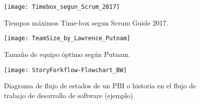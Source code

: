 \begin{figure}[h]
  \centering
  \texttt{[image: Timebox\_segun\_Scrum\_2017]}
  \caption{Tiempos máximos Time-box segun Scrum Guide 2017.}
  \centering
  \label{fig:Timebox_segun_Scrum_2017} 
\end{figure}
\FloatBarrier

\begin{figure}[h]
  \centering
  \texttt{[image: TeamSize\_by\_Lawrence\_Putnam]}
  \caption{Tamaño de equipo óptimo según Putnam.}
  \centering
  \label{fig:TeamSize_by_Lawrence_Putnam} 
\end{figure}
\FloatBarrier

\begin{figure}[h]
  \centering
  \texttt{[image: StoryForkflow-Flowchart\_BW]}
  \caption{Diagrama de flujo de estados de un PBI o historia en el flujo de trabajo de desarrollo de software (ejemplo)}
  \centering
  \label{fig:StoryForkflow-Flowchart_BW} 
\end{figure}
\FloatBarrier
